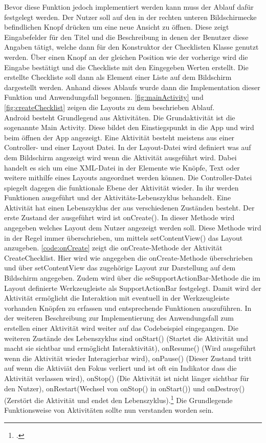 Bevor diese Funktion jedoch implementiert werden kann muss der Ablauf dafür festgelegt werden. Der Nutzer soll auf den in der rechten unteren Bildschirmecke befindlichen Knopf drücken um eine neue Ansicht zu öffnen. Diese zeigt Eingabefelder für den Titel und die Beschreibung in denen der Benutzer diese Angaben tätigt, welche dann für den Konstruktor der Checklisten Klasse genutzt werden. Über einen Knopf an der gleichen Position wie der vorherige wird die Eingabe bestätigt und die Checkliste mit den Eingegeben Werten erstellt. Die erstellte Checkliste soll dann als Element einer Liste auf dem Bildschirm dargestellt werden. Anhand dieses Ablaufs wurde dann die Implementation dieser Funktion und Anwendungsfall begonnen. \autoref{fig:mainActivity} und \autoref{fig:createChecklist} zeigen die Layouts zu dem beschrieben Ablauf.\\
Android besteht Grundlegend aus Aktivitäten. Die Grundaktivität ist die sogenannte \glqq Main Activity\grqq. Diese bildet den Einstiegspunkt in die App und wird beim öffnen der App angezeigt. Eine Aktivität besteht meistens aus einer \grqq Controller-\grqq{} und einer Layout Datei. In der Layout-Datei wird definiert was auf dem Bildschirm angezeigt wird wenn die Aktivität ausgeführt wird. Dabei handelt es sich um eine XML-Datei in der Elemente wie Knöpfe, Text oder weitere mithilfe eines Layouts angeordnet werden können. Die Controller-Datei spiegelt dagegen die funktionale Ebene der Aktivität wieder. In ihr werden Funktionen ausgeführt und der Aktivitäts-Lebenszyklus behandelt. Eine Aktivität hat einen Lebenszyklus der aus verschiedenen Zuständen besteht. Der erste Zustand der ausgeführt wird ist \glqq onCreate()\grqq. In dieser Methode wird angegeben welches Layout dem Nutzer angezeigt werden soll. Diese Methode wird in der Regel immer überschrieben, um mittels setContentView() das Layout anzugeben. \autoref{code:onCreate} zeigt die onCreate-Methode der Aktivität CreateChecklist. Hier wird wie angegeben die onCreate-Methode überschrieben und über setContentView das zugehörige Layout zur Darstellung auf dem Bildschirm angegeben. Zudem wird über die seSupportActionBar-Methode die im Layout definierte Werkzeugleiste als SupportActionBar festgelegt. Damit wird der Aktivität ermöglicht die Interaktion mit eventuell in der Werkzeugleiste vorhanden Knöpfen zu erfassen und entsprechende Funktionen auszuführen. In der weiteren Beschreibung zur Implementierung des Anwendungsfall zum erstellen einer Aktivität wird weiter auf das Codebeispiel eingegangen. Die weiteren Zustände des Lebenszyklus sind onStart() (Startet die Aktivität und macht sie sichtbar und ermöglicht Interaktivität), onResume() (Wird ausgeführt wenn die Aktivität wieder Interagierbar wird), onPause() (Dieser Zustand tritt auf wenn die Aktiviät den Fokus verliert und ist oft ein Indikator dass die Aktivität verlassen wird), onStop() (Die Aktivität ist nicht länger sichtbar für den Nutzer), onRestart(Wechsel von onStop() in onStart()) und onDestroy() (Zerstört die Aktivität und endet den Lebenszyklus).\footcite{Aktivitäten.2021} Die Grundlegende Funktionsweise von Aktivitäten sollte nun verstanden worden sein.\\
